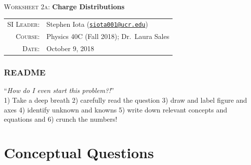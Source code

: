 \documentclass{article}
\newcommand{\email}[1]{\texttt{\href{mailto:#1}{#1}}}
\begin{document}
\begin{center}

\Large{\textsc{Worksheet 2a}: \textbf{Charge Distributions}}

\end{center}

\vspace{.5mm}


\begin{tabular}{rl}
\textsc{SI Leader}:
&
Stephen Iota (\email{siota001@ucr.edu})
\\
\textsc{Course}:
&
Physics 40C (Fall 2018); Dr.~Laura Sales
\\
\textsc{Date}:
&
October 9, 2018
\end{tabular}


\subsubsection*{README}

``\textit{How do I even start this problem?!}''\\
1) Take a deep breath
2) carefully read the question
3) draw and label figure and axes
4) identify unknown and knowns
5) write down relevant concepts and equations and 
6) crunch the numbers!


\section{Conceptual Questions}
\end{document}
